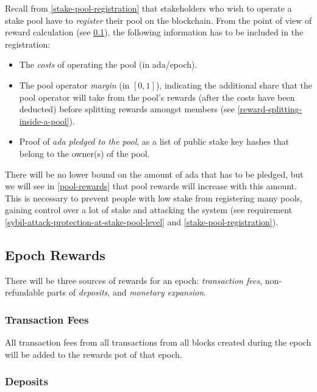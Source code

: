 \documentclass[11pt,a4paper,dvipsnames,twosided]{article}
\begin{document}
Recall from \cref{stake-pool-registration} that stakeholders
who wish to operate a stake pool have to \emph{register} their
pool on the blockchain. From the point of view of reward calculation
(see \cref{epoch-rewards}), the following information has to
be included in the registration:

\begin{itemize}
\item
  The \emph{costs} of operating the pool (in ada/epoch).
\item
  The pool operator \emph{margin} (in \([0,1]\)), indicating the additional
  share that the pool operator will take from the pool's rewards (after the
  costs have been deducted) before splitting rewards amongst members (see
  \cref{reward-splitting-inside-a-pool}).
\item
  Proof of \emph{ada pledged to the pool}, as a list of public stake
  key hashes that belong to the owner(s) of the pool.
\end{itemize}

There will be no lower bound on the amount of ada that has to be
pledged, but we will see in \cref{pool-rewards} that pool
rewards will increase with this amount. This is necessary to prevent
people with low stake from registering many pools, gaining control over
a lot of stake and attacking the system (see requirement
\ref{sybil-attack-protection-at-stake-pool-level} and \cref{stake-pool-registration}).

\subsection{Epoch Rewards}
\label{epoch-rewards}

There will be three sources of rewards for an epoch: \emph{transaction
  fees}, non-refundable parts of \emph{deposits}, and \emph{monetary
  expansion}.

\subsubsection{Transaction Fees}
\label{transaction-fees-1}

All transaction fees from all transactions from all blocks created
during the epoch will be added to the rewards pot of that epoch.

\subsubsection{Deposits}
\label{deposits-1}
\end{document}
